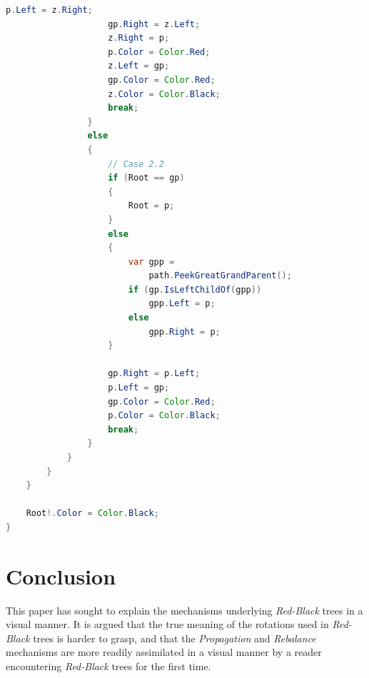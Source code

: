 \documentclass{article}
\begin{document}
\begin{lstlisting}[language=java]
                    p.Left = z.Right;
                    gp.Right = z.Left;
                    z.Right = p;
                    p.Color = Color.Red;
                    z.Left = gp;
                    gp.Color = Color.Red;
                    z.Color = Color.Black;
                    break;
                }
                else
                {
                    // Case 2.2
                    if (Root == gp)
                    {
                        Root = p;
                    }
                    else
                    {
                        var gpp =
                            path.PeekGreatGrandParent();
                        if (gp.IsLeftChildOf(gpp))
                            gpp.Left = p;
                        else
                            gpp.Right = p;
                    }

                    gp.Right = p.Left;
                    p.Left = gp;
                    gp.Color = Color.Red;
                    p.Color = Color.Black;
                    break;
                }
            }
        }
    }

    Root!.Color = Color.Black;
}
\end{lstlisting}

\section{Conclusion}

This paper has sought to explain the mechanisms underlying \emph{Red-Black} trees in a visual manner.
It is argued that the true meaning of the rotations used in \emph{Red-Black} trees is harder to grasp, and that the
\emph{Propagation} and \emph{Rebalance} mechanisms are more readily assimilated in a visual manner by a reader
encountering \emph{Red-Black} trees for the first time.

\printbibliography
\end{document}
